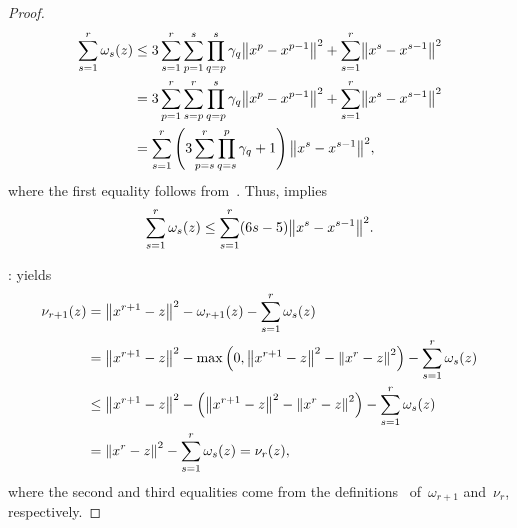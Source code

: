 \documentclass[../main]{subfiles}
\begin{document}
\begin{proof}
\begin{equation}
\begin{split}
        \sum_{s = 1}^r \omega_s(z)
        &\le 3 \sum_{s = 1}^r \sum_{p = 1}^s \prod_{q = p}^s \gamma_q \norm*{x^p - x^{p - 1}}^2 + \sum_{s = 1}^r \norm*{x^s - x^{s - 1}}^2 \\
        &= 3 \sum_{p = 1}^r \sum_{s = p}^r \prod_{q = p}^s \gamma_q \norm*{x^p - x^{p - 1}}^2 + \sum_{s = 1}^r \norm*{x^s - x^{s - 1}}^2 \\
        &= \sum_{s = 1}^r \left( 3 \sum_{p = s}^r \prod_{q = s}^p \gamma_q + 1 \right) \norm*{x^s - x^{s - 1}}^2
        ,\end{split}
    \end{equation}
    where the first equality follows from~.
    Thus,  implies
    \begin{equation}
        \sum_{s = 1}^{r} \omega_s(z) \le \sum_{s = 1}^{r} (6 s - 5) \norm*{x^s - x^{s - 1}}^2 
    .\end{equation}

    :
     yields
    \begin{equation}
        \begin{split}
            \nu_{r + 1}(z) &= \norm*{x^{r + 1} - z}^2 - \omega_{r + 1}(z) - \sum_{s = 1}^r \omega_s(z) \\
                           &= \norm*{x^{r + 1} - z}^2 - \max \left( 0, \norm*{x^{r + 1} - z}^2 - \norm*{x^r - z}^2 \right) - \sum_{s = 1}^{r} \omega_s(z) \\
                           &\le \norm*{x^{r + 1} - z}^2 - \left( \norm*{x^{r + 1} - z}^2 - \norm*{x^r - z}^2 \right) - \sum_{s = 1}^{r} \omega_s(z) \\
                           &= \norm*{x^r - z}^2 - \sum_{s = 1}^{r} \omega_s(z) = \nu_r(z) 
        ,\end{split}
    \end{equation} 
    where the second and third equalities come from the definitions~ of~$\omega_{r + 1}$ and~$\nu_r$, respectively.
\end{proof}
\end{document}
